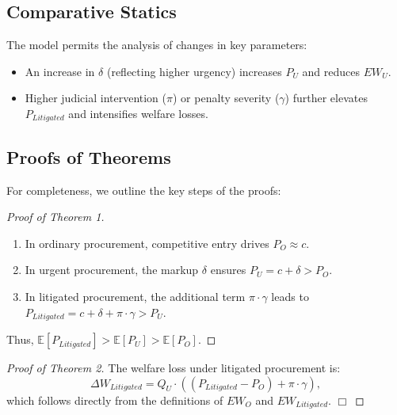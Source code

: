 \subsection{Comparative Statics}
The model permits the analysis of changes in key parameters:
\begin{itemize}
    \item An increase in \(\delta\) (reflecting higher urgency) increases \(P_U\) and reduces \(EW_U\).
    \item Higher judicial intervention (\(\pi\)) or penalty severity (\(\gamma\)) further elevates \(P_{Litigated}\) and intensifies welfare losses.
\end{itemize}

\subsection{Proofs of Theorems}
For completeness, we outline the key steps of the proofs:

\begin{proof}[Proof of Theorem 1]
    \begin{enumerate}
        \item In ordinary procurement, competitive entry drives \(P_O \approx c\).
        \item In urgent procurement, the markup \(\delta\) ensures \(P_U = c + \delta > P_O\).
        \item In litigated procurement, the additional term \(\pi \cdot \gamma\) leads to \(P_{Litigated} = c + \delta + \pi \cdot \gamma > P_U\).
    \end{enumerate}
    Thus, \(\mathbb{E}[P_{Litigated}] > \mathbb{E}[P_U] > \mathbb{E}[P_O]\).
\end{proof}

\begin{proof}[Proof of Theorem 2]
    The welfare loss under litigated procurement is:
    \[
    \Delta W_{Litigated} = Q_U \cdot \left((P_{Litigated} - P_O) + \pi \cdot \gamma\right),
    \]
    which follows directly from the definitions of \(EW_O\) and \(EW_{Litigated}\). \(\Box\)
\end{proof}
